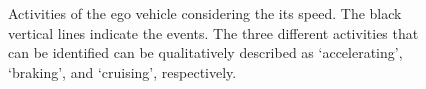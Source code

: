\begin{figure}
	\centering
	\setlength\figureheight{130pt}
	\setlength\figurewidth{248pt}
	
	\caption{Activities of the ego vehicle considering the its speed. The black vertical lines indicate the events. The three different activities that can be identified can be qualitatively described as `accelerating', `braking', and `cruising', respectively.}
	\label{fig:example ego states}
\end{figure}



%	
